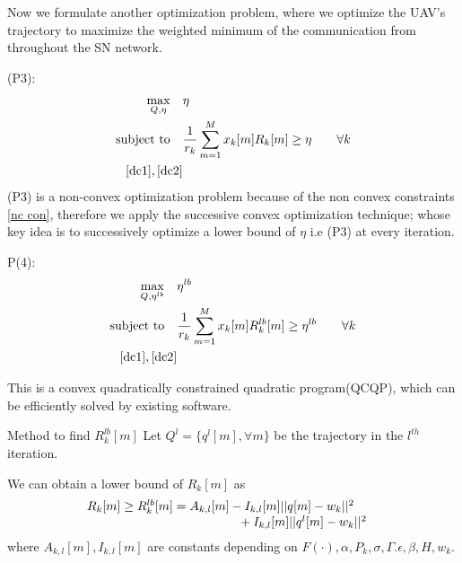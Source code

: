 \documentclass{beamer}
\providecommand{\brak}[1]{\ensuremath{\left(#1\right)}}
\begin{document}
\begin{frame}{}
 Now we formulate another optimization problem, where we optimize the UAV's trajectory to maximize the weighted minimum of the communication from throughout the SN network.
 
 (P3):
 \begin{align}
     \max_{Q,\eta} \quad& \eta\\
     \text{subject to} \quad &\frac{1}{r_k}\sum_{m=1}^Mx_k[m]R_k[m] \geq\eta\quad &\forall k \label{nc con}\\
     \eqref{dc1}, \eqref{dc2}
 \end{align}
 (P3) is a non-convex optimization problem because of the non convex constraints \eqref{nc con}, therefore we apply the successive convex optimization technique; whose key idea is to successively optimize a lower bound of $\eta$ i.e (P3) at every iteration. 
\end{frame}
\begin{frame}{}
\begin{block}{}
 
P(4):
 \begin{align}
     \max_{Q,\eta^{lb}} \quad& \eta^{lb}\\
     \text{subject to} \quad &\frac{1}{r_k}\sum_{m=1}^Mx_k[m]R_k^{lb}[m] \geq\eta^{lb}\quad &\forall k \\
     \eqref{dc1}, \eqref{dc2}
 \end{align}
\end{block}    
This is a convex quadratically constrained quadratic program(QCQP), which can be efficiently solved by existing software. 
\end{frame}
\begin{frame}{Method to find $R_k^{lb}[m]$}
Let $Q^l=\{q^l[m], \forall m\}$  be the trajectory in the $l^{th}$ iteration.
    
We can obtain a lower bound of $R_k[m]$ as 
\begin{align}
&\splitfrac{R_k[m]\geq R_k^{lb}[m]=A_{k,l}[m]-I_{k,l}[m]||q[m]-w_k||^2}{+I_{k,l}[m]||q^l[m]-w_k||^2}
\end{align}
where $A_{k,l}[m], I_{k,l}[m]$ are constants depending on  $F(\cdot), \alpha, P_k, \sigma, \Gamma. \epsilon, \beta, H, w_k$.




\end{frame}
\end{document}
